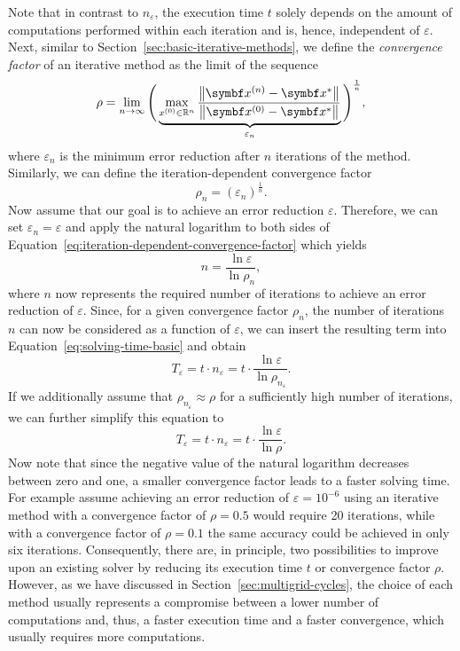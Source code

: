 Note that in contrast to $n_{\varepsilon}$, the execution time $t$ solely depends on the amount of computations performed within each iteration and is, hence, independent of $\varepsilon$.
Next, similar to Section~\ref{sec:basic-iterative-methods}, we define the \emph{convergence factor} of an iterative method as the limit of the sequence
\begin{equation*}
	\rho = \lim \limits_{n \to  \infty} \Bigg( \underbrace{ \max \limits_{x^{(0)} \in \mathbb{R}^{n}} \frac{\norm{\bm{x}^{(n)} - \bm{x}^{*}}}{\norm{\bm{x}^{(0)} - \bm{x}^{*}}} }_{\varepsilon_n} \Bigg)^{\frac{1}{n}},
\end{equation*}
where $\varepsilon_n$  is the minimum error reduction after $n$ iterations of the method.
Similarly, we can define the iteration-dependent convergence factor
\begin{equation}
	\rho_n = \left( \varepsilon_n \right)^{\frac{1}{n}}.
	\label{eq:iteration-dependent-convergence-factor}
\end{equation} 
Now assume that our goal is to achieve an error reduction $\varepsilon$.
Therefore, we can set $\varepsilon_n = \varepsilon$ and apply the natural logarithm to both sides of Equation~\eqref{eq:iteration-dependent-convergence-factor} which yields
\begin{equation*}
	n = \frac{\ln \varepsilon}{\ln \rho_n},
\end{equation*} 
where $n$ now represents the required number of iterations to achieve an error reduction of $\varepsilon$.
Since, for a given convergence factor $\rho_n$, the number of iterations $n$ can now be considered as a function of $\varepsilon$, we can insert the resulting term into Equation~\eqref{eq:solving-time-basic} and obtain
\begin{equation*}
	T_{\varepsilon} = t \cdot n_{\varepsilon} = t \cdot \frac{\ln \varepsilon}{\ln \rho_{n_{\varepsilon}}}.
\end{equation*} 
If we additionally assume that $\rho_{n_{\varepsilon}} \approx \rho$ for a sufficiently high number of iterations, we can further simplify this equation to
\begin{equation}
	T_{\varepsilon} = t \cdot n_{\varepsilon} = t \cdot \frac{\ln \varepsilon}{\ln \rho}.
	\label{eq:solving-time}
\end{equation} 
Now note that since the negative value of the natural logarithm decreases between zero and one, a smaller convergence factor leads to a faster solving time.
For example assume achieving an error reduction of $\varepsilon = 10^{-6}$ using an iterative method with a convergence factor of $\rho = 0.5$ would require 20 iterations, while with a convergence factor of $\rho = 0.1$ the same accuracy could be achieved in only six iterations.
Consequently, there are, in principle, two possibilities to improve upon an existing solver by reducing its execution time $t$ or convergence factor $\rho$. 
However, as we have discussed in Section~\ref{sec:multigrid-cycles}, the choice of each method usually represents a compromise between a lower number of computations and, thus, a faster execution time and a faster convergence, which usually requires more computations.

